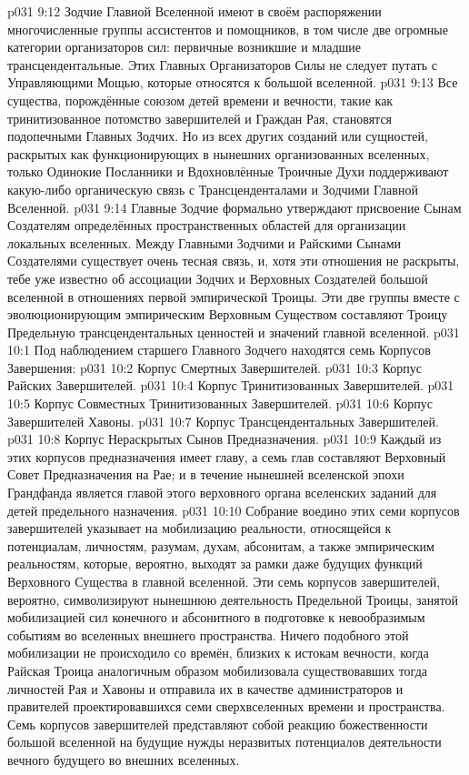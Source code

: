 \vs p031 9:12 Зодчие Главной Вселенной имеют в своём распоряжении многочисленные группы ассистентов и помощников, в том числе две огромные категории организаторов сил: первичные возникшие и младшие трансцендентальные. Этих Главных Организаторов Силы не следует путать с Управляющими Мощью, которые относятся к большой вселенной.
\vs p031 9:13 Все существа, порождённые союзом детей времени и вечности, такие как тринитизованное потомство завершителей и Граждан Рая, становятся подопечными Главных Зодчих. Но из всех других созданий или сущностей, раскрытых как функционирующих в нынешних организованных вселенных, только Одинокие Посланники и Вдохновлённые Троичные Духи поддерживают какую\hyp{}либо органическую связь с Трансценденталами и Зодчими Главной Вселенной.
\vs p031 9:14 Главные Зодчие формально утверждают присвоение Сынам Создателям определённых пространственных областей для организации локальных вселенных. Между Главными Зодчими и Райскими Сынами Создателями существует очень тесная связь, и, хотя эти отношения не раскрыты, тебе уже известно об ассоциации Зодчих и Верховных Создателей большой вселенной в отношениях первой эмпирической Троицы. Эти две группы вместе с эволюционирующим эмпирическим Верховным Существом составляют Троицу Предельную трансцендентальных ценностей и значений главной вселенной.
\vs p031 10:1 Под наблюдением старшего Главного Зодчего находятся семь Корпусов Завершения:
\vs p031 10:2 Корпус Смертных Завершителей.
\vs p031 10:3 Корпус Райских Завершителей.
\vs p031 10:4 Корпус Тринитизованных Завершителей.
\vs p031 10:5 Корпус Совместных Тринитизованных Завершителей.
\vs p031 10:6 Корпус Завершителей Хавоны.
\vs p031 10:7 Корпус Трансцендентальных Завершителей.
\vs p031 10:8 Корпус Нераскрытых Сынов Предназначения.
\vs p031 10:9 Каждый из этих корпусов предназначения имеет главу, а семь глав составляют Верховный Совет Предназначения на Рае; и в течение нынешней вселенской эпохи Грандфанда является главой этого верховного органа вселенских заданий для детей предельного назначения.
\vs p031 10:10 Собрание воедино этих семи корпусов завершителей указывает на мобилизацию реальности, относящейся к потенциалам, личностям, разумам, духам, абсонитам, а также эмпирическим реальностям, которые, вероятно, выходят за рамки даже будущих функций Верховного Существа в главной вселенной. Эти семь корпусов завершителей, вероятно, символизируют нынешнюю деятельность Предельной Троицы, занятой мобилизацией сил конечного и абсонитного в подготовке к невообразимым событиям во вселенных внешнего пространства. Ничего подобного этой мобилизации не происходило со времён, близких к истокам вечности, когда Райская Троица аналогичным образом мобилизовала существовавших тогда личностей Рая и Хавоны и отправила их в качестве администраторов и правителей проектировавшихся семи сверхвселенных времени и пространства. Семь корпусов завершителей представляют собой реакцию божественности большой вселенной на будущие нужды неразвитых потенциалов деятельности вечного будущего во внешних вселенных.
